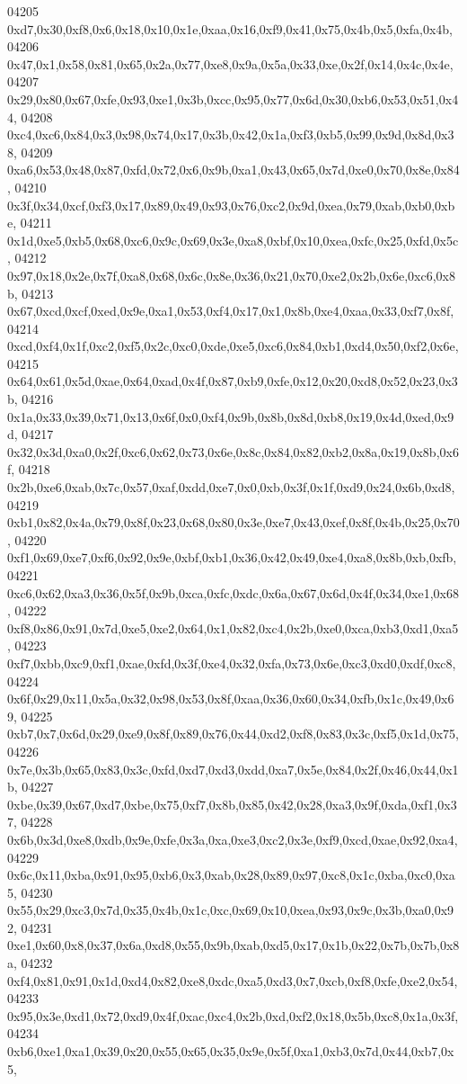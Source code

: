 \begin{DoxyCode}
04205   0xd7,0x30,0xf8,0x6,0x18,0x10,0x1e,0xaa,0x16,0xf9,0x41,0x75,0x4b,0x5,0xfa,0x4b,
04206   0x47,0x1,0x58,0x81,0x65,0x2a,0x77,0xe8,0x9a,0x5a,0x33,0xe,0x2f,0x14,0x4c,0x4e,
04207   0x29,0x80,0x67,0xfe,0x93,0xe1,0x3b,0xcc,0x95,0x77,0x6d,0x30,0xb6,0x53,0x51,0x44,
04208   0xc4,0xc6,0x84,0x3,0x98,0x74,0x17,0x3b,0x42,0x1a,0xf3,0xb5,0x99,0x9d,0x8d,0x38,
04209   0xa6,0x53,0x48,0x87,0xfd,0x72,0x6,0x9b,0xa1,0x43,0x65,0x7d,0xe0,0x70,0x8e,0x84,
04210   0x3f,0x34,0xcf,0xf3,0x17,0x89,0x49,0x93,0x76,0xc2,0x9d,0xea,0x79,0xab,0xb0,0xbe,
04211   0x1d,0xe5,0xb5,0x68,0xc6,0x9c,0x69,0x3e,0xa8,0xbf,0x10,0xea,0xfc,0x25,0xfd,0x5c,
04212   0x97,0x18,0x2e,0x7f,0xa8,0x68,0x6c,0x8e,0x36,0x21,0x70,0xe2,0x2b,0x6e,0xc6,0x8b,
04213   0x67,0xcd,0xcf,0xed,0x9e,0xa1,0x53,0xf4,0x17,0x1,0x8b,0xe4,0xaa,0x33,0xf7,0x8f,
04214   0xcd,0xf4,0x1f,0xc2,0xf5,0x2c,0xc0,0xde,0xe5,0xc6,0x84,0xb1,0xd4,0x50,0xf2,0x6e,
04215   0x64,0x61,0x5d,0xae,0x64,0xad,0x4f,0x87,0xb9,0xfe,0x12,0x20,0xd8,0x52,0x23,0x3b,
04216   0x1a,0x33,0x39,0x71,0x13,0x6f,0x0,0xf4,0x9b,0x8b,0x8d,0xb8,0x19,0x4d,0xed,0x9d,
04217   0x32,0x3d,0xa0,0x2f,0xc6,0x62,0x73,0x6e,0x8c,0x84,0x82,0xb2,0x8a,0x19,0x8b,0x6f,
04218   0x2b,0xe6,0xab,0x7c,0x57,0xaf,0xdd,0xe7,0x0,0xb,0x3f,0x1f,0xd9,0x24,0x6b,0xd8,
04219   0xb1,0x82,0x4a,0x79,0x8f,0x23,0x68,0x80,0x3e,0xe7,0x43,0xef,0x8f,0x4b,0x25,0x70,
04220   0xf1,0x69,0xe7,0xf6,0x92,0x9e,0xbf,0xb1,0x36,0x42,0x49,0xe4,0xa8,0x8b,0xb,0xfb,
04221   0xc6,0x62,0xa3,0x36,0x5f,0x9b,0xca,0xfc,0xdc,0x6a,0x67,0x6d,0x4f,0x34,0xe1,0x68,
04222   0xf8,0x86,0x91,0x7d,0xe5,0xe2,0x64,0x1,0x82,0xc4,0x2b,0xe0,0xca,0xb3,0xd1,0xa5,
04223   0xf7,0xbb,0xc9,0xf1,0xae,0xfd,0x3f,0xe4,0x32,0xfa,0x73,0x6e,0xc3,0xd0,0xdf,0xc8,
04224   0x6f,0x29,0x11,0x5a,0x32,0x98,0x53,0x8f,0xaa,0x36,0x60,0x34,0xfb,0x1c,0x49,0x69,
04225   0xb7,0x7,0x6d,0x29,0xe9,0x8f,0x89,0x76,0x44,0xd2,0xf8,0x83,0x3c,0xf5,0x1d,0x75,
04226   0x7e,0x3b,0x65,0x83,0x3c,0xfd,0xd7,0xd3,0xdd,0xa7,0x5e,0x84,0x2f,0x46,0x44,0x1b,
04227   0xbe,0x39,0x67,0xd7,0xbe,0x75,0xf7,0x8b,0x85,0x42,0x28,0xa3,0x9f,0xda,0xf1,0x37,
04228   0x6b,0x3d,0xe8,0xdb,0x9e,0xfe,0x3a,0xa,0xe3,0xc2,0x3e,0xf9,0xcd,0xae,0x92,0xa4,
04229   0x6c,0x11,0xba,0x91,0x95,0xb6,0x3,0xab,0x28,0x89,0x97,0xc8,0x1c,0xba,0xc0,0xa5,
04230   0x55,0x29,0xc3,0x7d,0x35,0x4b,0x1c,0xc,0x69,0x10,0xea,0x93,0x9c,0x3b,0xa0,0x92,
04231   0xe1,0x60,0x8,0x37,0x6a,0xd8,0x55,0x9b,0xab,0xd5,0x17,0x1b,0x22,0x7b,0x7b,0x8a,
04232   0xf4,0x81,0x91,0x1d,0xd4,0x82,0xe8,0xdc,0xa5,0xd3,0x7,0xcb,0xf8,0xfe,0xe2,0x54,
04233   0x95,0x3e,0xd1,0x72,0xd9,0x4f,0xac,0xc4,0x2b,0xd,0xf2,0x18,0x5b,0xc8,0x1a,0x3f,
04234   0xb6,0xe1,0xa1,0x39,0x20,0x55,0x65,0x35,0x9e,0x5f,0xa1,0xb3,0x7d,0x44,0xb7,0x5,

\end{DoxyCode}
